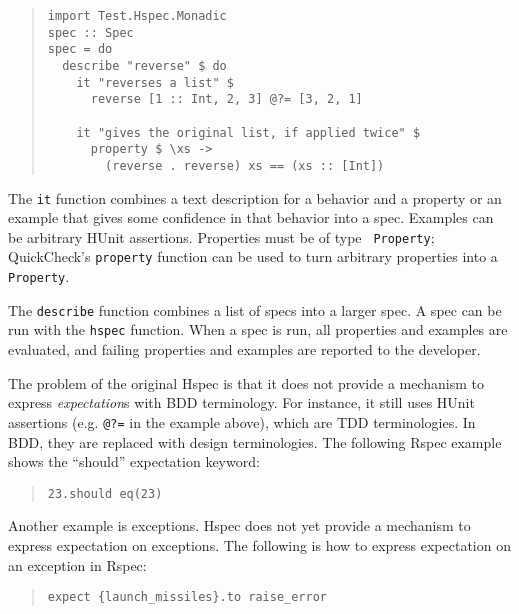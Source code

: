 \documentclass[preprint]{sigplanconf}
\begin{document}
\begin{quote}
\small
\begin{verbatim}
import Test.Hspec.Monadic
spec :: Spec
spec = do
  describe "reverse" $ do
    it "reverses a list" $
      reverse [1 :: Int, 2, 3] @?= [3, 2, 1]

    it "gives the original list, if applied twice" $
      property $ \xs ->
        (reverse . reverse) xs == (xs :: [Int])
\end{verbatim}
\end{quote}

\noindent The {\tt it} function combines a text description for a
behavior and a property or an example that gives some confidence in
that behavior into a spec.
Examples can be arbitrary HUnit assertions.  Properties must be of type {\tt
Property}; QuickCheck's \texttt{property} function can be used to turn
arbitrary properties into a \texttt{Property}.

The \texttt{describe} function combines a list of specs into a larger spec.
A spec can be run with the \texttt{hspec} function.  When a spec is
run, all properties and examples are evaluated, and failing properties
and examples are reported to the developer.

The problem of the original Hspec is that it does not provide
a mechanism to express \emph{expectation}\/s with
BDD terminology.
For instance,
it still uses HUnit
assertions (e.g. \verb|@?=| in the example above), which are TDD
terminologies. In BDD, they are replaced with design terminologies.
The following Rspec example shows the ``should'' expectation keyword:

\begin{quote}
\small
\begin{verbatim}
23.should eq(23)
\end{verbatim}
\end{quote}

\noindent Another example is exceptions. Hspec does not yet provide a
mechanism to express expectation on exceptions. The following is
how to express expectation on an exception in Rspec:

\begin{quote}
\small
\begin{verbatim}
expect {launch_missiles}.to raise_error
\end{verbatim}
\end{quote}
\end{document}
